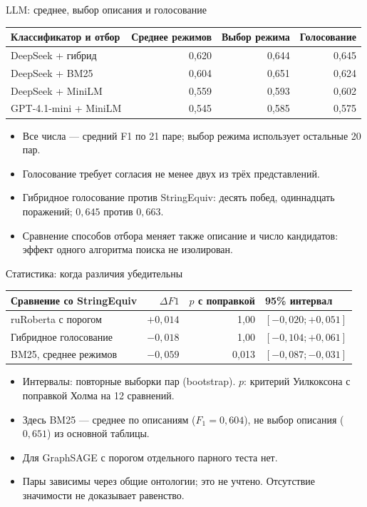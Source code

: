 \documentclass[aspectratio=169,11pt]{beamer}
\begin{document}
\renewcommand{\hseheadertext}{Дополнительные материалы}
\begin{frame}{LLM: среднее, выбор описания и голосование}
  \begin{tabular}{@{}lrrr@{}}
    \toprule
    Классификатор и отбор & Среднее режимов & Выбор режима & Голосование \\
    \midrule
    DeepSeek + гибрид & 0{,}620 & 0{,}644 & 0{,}645 \\
    DeepSeek + BM25 & 0{,}604 & 0{,}651 & 0{,}624 \\
    DeepSeek + MiniLM & 0{,}559 & 0{,}593 & 0{,}602 \\
    GPT-4.1-mini + MiniLM & 0{,}545 & 0{,}585 & 0{,}575 \\
    \bottomrule
  \end{tabular}
  \medskip
  \begin{itemize}
    \item Все числа — средний F1 по 21 паре; выбор режима использует остальные 20 пар.
    \item Голосование требует согласия не менее двух из трёх представлений.
    \item Гибридное голосование против StringEquiv: десять побед,
      одиннадцать поражений; $0{,}645$ против $0{,}663$.
    \item Сравнение способов отбора меняет также описание и число кандидатов:
      эффект одного алгоритма поиска не изолирован.
  \end{itemize}
\end{frame}

\renewcommand{\hseheadertext}{Дополнительные материалы}
\begin{frame}{Статистика: когда различия убедительны}
  \begin{tabular}{@{}lrrl@{}}
    \toprule
    Сравнение со StringEquiv & $\Delta F1$ & $p$ с поправкой & 95\% интервал \\
    \midrule
    ruRoberta с порогом & $+0{,}014$ & 1{,}00 & $[-0{,}020; +0{,}051]$ \\
    Гибридное голосование & $-0{,}018$ & 1{,}00 & $[-0{,}104; +0{,}061]$ \\
    BM25, среднее режимов & $-0{,}059$ & 0{,}013 & $[-0{,}087; -0{,}031]$ \\
    \bottomrule
  \end{tabular}
  \medskip
  \begin{itemize}
    \item Интервалы: повторные выборки пар (bootstrap).
      $p$: критерий Уилкоксона с поправкой Холма на 12 сравнений.
    \item Здесь BM25 — среднее по описаниям ($F_1=0{,}604$),
      не выбор описания ($0{,}651$) из основной таблицы.
    \item Для GraphSAGE с порогом отдельного парного теста нет.
    \item Пары зависимы через общие онтологии; это не учтено.
      Отсутствие значимости не доказывает равенство.
  \end{itemize}
\end{frame}
\end{document}
